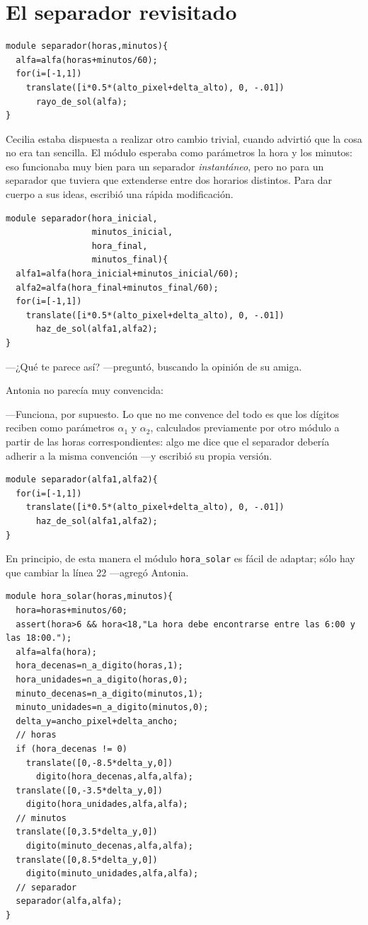 \section{El separador revisitado}

\begin{lstlisting}
module separador(horas,minutos){
  alfa=alfa(horas+minutos/60);
  for(i=[-1,1])
    translate([i*0.5*(alto_pixel+delta_alto), 0, -.01])
      rayo_de_sol(alfa);
}
\end{lstlisting}

Cecilia estaba dispuesta a realizar otro cambio trivial, cuando
advirtió que la cosa no era tan sencilla. El módulo esperaba como
parámetros la hora y los minutos: eso funcionaba muy bien para un
separador \emph{instantáneo}, pero no para un separador que tuviera
que extenderse entre dos horarios distintos. Para dar cuerpo a sus
ideas, escribió una rápida modificación.

\begin{lstlisting}
module separador(hora_inicial,
                 minutos_inicial,
                 hora_final,
                 minutos_final){
  alfa1=alfa(hora_inicial+minutos_inicial/60);
  alfa2=alfa(hora_final+minutos_final/60);
  for(i=[-1,1])
    translate([i*0.5*(alto_pixel+delta_alto), 0, -.01])
      haz_de_sol(alfa1,alfa2);
}
\end{lstlisting}

---¿Qué te parece así? ---preguntó, buscando la opinión de su amiga.

Antonia no parecía muy convencida:

---Funciona, por supuesto. Lo que no me convence del todo es que los
dígitos reciben como parámetros $\alpha_1$ y $\alpha_2$, calculados
previamente por otro módulo a partir de las horas correspondientes:
algo me dice que el separador debería adherir a la misma convención
---y escribió su propia versión.

\begin{lstlisting}
module separador(alfa1,alfa2){
  for(i=[-1,1])
    translate([i*0.5*(alto_pixel+delta_alto), 0, -.01])
      haz_de_sol(alfa1,alfa2);
}
\end{lstlisting}

\guillemotright En principio, de esta manera el módulo
\lstinline!hora_solar!  es fácil de adaptar; sólo hay que cambiar la
línea 22 ---agregó Antonia.

\begin{lstlisting}
module hora_solar(horas,minutos){
  hora=horas+minutos/60;
  assert(hora>6 && hora<18,"La hora debe encontrarse entre las 6:00 y las 18:00.");
  alfa=alfa(hora);
  hora_decenas=n_a_digito(horas,1);
  hora_unidades=n_a_digito(horas,0);
  minuto_decenas=n_a_digito(minutos,1);
  minuto_unidades=n_a_digito(minutos,0);                    
  delta_y=ancho_pixel+delta_ancho;
  // horas    
  if (hora_decenas != 0)
    translate([0,-8.5*delta_y,0])
      digito(hora_decenas,alfa,alfa);
  translate([0,-3.5*delta_y,0])
    digito(hora_unidades,alfa,alfa);  
  // minutos
  translate([0,3.5*delta_y,0])
    digito(minuto_decenas,alfa,alfa);
  translate([0,8.5*delta_y,0])
    digito(minuto_unidades,alfa,alfa);  
  // separador
  separador(alfa,alfa);
}
\end{lstlisting}

